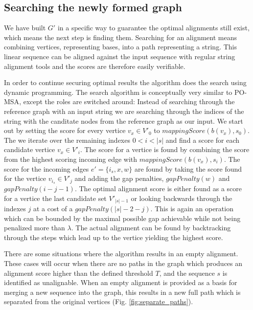 \documentclass[thesis.tex]{subfiles}
\begin{document}
\subsection{Searching the newly formed graph}
We have built $G'$ in a specific way to guarantee the optimal alignments still exist, which means the next step is finding them. Searching for an alignment means combining vertices, representing bases, into a path representing a string. This linear sequence can be aligned against the input sequence with regular string alignment tools and the scores are therefore easily verifiable.\\
\par\noindent
In order to continue securing optimal results the algorithm does the search using dynamic programming. The search algorithm is conceptually very similar to PO-MSA\cite{multiple_sequence_alignment_using_partial_order_graphs}, except the roles are switched around: Instead of searching through the reference graph with an input string we are searching through the indices of the string with the canditate nodes from the reference graph as our input. We start out by setting the score for every vertice $v_x \in V'_0$ to $mappingScore(b(v_x), s_0)$. The we iterate over the remaining indexes $0<i<|s|$ and find a score for each candidate vertice $v_x \in V'_i$. The score for a vertice is found by combining the score from the highest scoring incoming edge with $mappingScore(b(v_x), s_i)$. The score for the incoming edges $e'=\{i_s, x, w\}$ are found by taking the score found for the vertice $v_{i_s} \in V'_j$ and adding the gap penalties, $gapPenalty(w)$ and $gapPenalty(i-j-1)$. The optimal alignment score is either found as a score for a vertice the last candidate set $V'_{|s|-1}$ or looking backwards through the indexes $j$ at a cost of a $gapPenalty(|s|-2-j)$. This is again an operation which can be bounded by the maximal possible gap achievable while not being penalized more than $\lambda$. The actual alignment can be found by backtracking through the steps which lead up to the vertice yielding the highest score.\\
\par\noindent
There are some situations where the algorithm results in an empty alignment. These cases will occur when there are no paths in the graph which produces an alignment score higher than the defined threshold $T$, and the sequence $s$ is identified as unalignable. When an empty alignment is provided as a basis for merging a new sequence into the graph, this results in a new full path which is separated from the original vertices (Fig. \ref{fig:separate_paths}).
\end{document}
